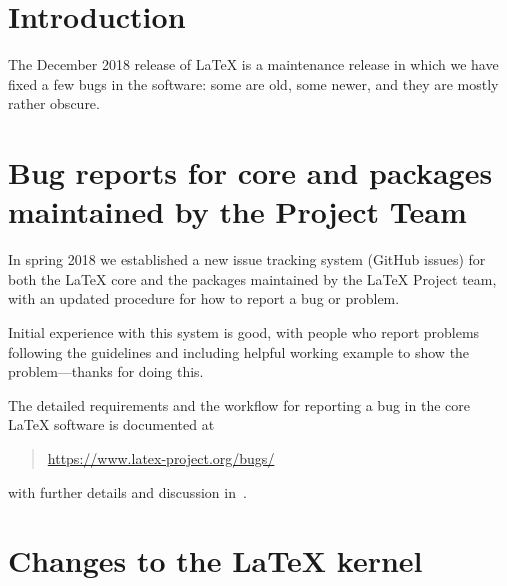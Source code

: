 \documentclass{ltnews}
\newcommand\githubissue[2][]{\ifhmode\unskip\fi
     \quad\penalty500\strut\nobreak\hfill
     \mbox{\small\itshape(github issue#1 #2)}\par}
\begin{document}
\maketitle
\tableofcontents

\setlength{}

\bigskip

\section{Introduction}

The December 2018 release of \LaTeX{} is a maintenance release in
which we have fixed a few bugs in the software: some are old, some
newer, and they are mostly rather obscure.


\section[Bug reports for core \LaTeXe{} and packages]
        {Bug reports for core \LaTeXe{} and packages maintained by the Project Team}

In spring 2018 we established a new issue tracking system (GitHub
issues) for both the \LaTeX{} core and the packages maintained by the
\LaTeX{} Project team, with an updated procedure for how to report a
bug or problem.

Initial experience with this system is good, with people who report
problems following the guidelines and including helpful working
example to show the problem---thanks for doing this.

The detailed requirements and the workflow for reporting a bug in the
core \LaTeX{} software is documented at
\begin{quote}
\url{https://www.latex-project.org/bugs/}
\end{quote}
with further details and discussion in~\cite{Mittelbach:TB39-1}.


\section{Changes to the \LaTeX{} kernel}


%
\end{document}
